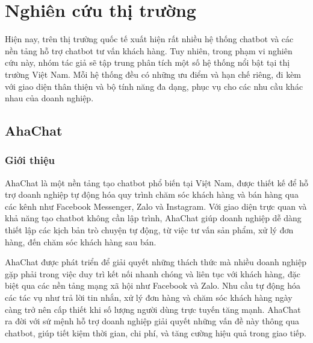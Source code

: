 \newpage
\section{Nghiên cứu thị trường}

Hiện nay, trên thị trường quốc tế xuất hiện rất nhiều hệ thống chatbot và các nền tảng hỗ trợ chatbot tư vấn khách hàng. Tuy nhiên, trong phạm vi nghiên cứu này, nhóm tác giả sẽ tập trung phân tích một số hệ thống nổi bật tại thị trường Việt Nam. Mỗi hệ thống đều có những ưu điểm và hạn chế riêng, đi kèm với giao diện thân thiện và bộ tính năng đa dạng, phục vụ cho các nhu cầu khác nhau của doanh nghiệp.
\subsection{AhaChat}
\subsubsection{Giới thiệu}
AhaChat là một nền tảng tạo chatbot phổ biến tại Việt Nam, được thiết kế để hỗ trợ doanh nghiệp tự động hóa quy trình chăm sóc khách hàng và bán hàng qua các kênh như Facebook Messenger, Zalo và Instagram. Với giao diện trực quan và khả năng tạo chatbot không cần lập trình, AhaChat giúp doanh nghiệp dễ dàng thiết lập các kịch bản trò chuyện tự động, từ việc tư vấn sản phẩm, xử lý đơn hàng, đến chăm sóc khách hàng sau bán.

AhaChat được phát triển để giải quyết những thách thức mà nhiều doanh nghiệp gặp phải trong việc duy trì kết nối nhanh chóng và liên tục với khách hàng, đặc biệt qua các nền tảng mạng xã hội như Facebook và Zalo. Nhu cầu tự động hóa các tác vụ như trả lời tin nhắn, xử lý đơn hàng và chăm sóc khách hàng ngày càng trở nên cấp thiết khi số lượng người dùng trực tuyến tăng mạnh. AhaChat ra đời với sứ mệnh hỗ trợ doanh nghiệp giải quyết những vấn đề này thông qua chatbot, giúp tiết kiệm thời gian, chi phí, và tăng cường hiệu quả trong giao tiếp.

